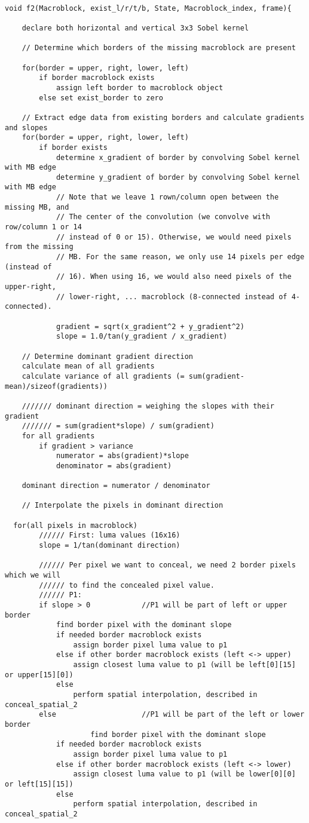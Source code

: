 \vspace{1em}
\begin{lstlisting}[frame=single]

void f2(Macroblock, exist_l/r/t/b, State, Macroblock_index, frame){
	
	declare both horizontal and vertical 3x3 Sobel kernel

	// Determine which borders of the missing macroblock are present

	for(border = upper, right, lower, left)
		if border macroblock exists
			assign left border to macroblock object 
		else set exist_border to zero

	// Extract edge data from existing borders and calculate gradients and slopes
	for(border = upper, right, lower, left)
		if border exists
			determine x_gradient of border by convolving Sobel kernel with MB edge
			determine y_gradient of border by convolving Sobel kernel with MB edge
			// Note that we leave 1 rown/column open between the missing MB, and
			// The center of the convolution (we convolve with row/column 1 or 14
			// instead of 0 or 15). Otherwise, we would need pixels from the missing
			// MB. For the same reason, we only use 14 pixels per edge (instead of 
			// 16). When using 16, we would also need pixels of the upper-right, 
			// lower-right, ... macroblock (8-connected instead of 4-connected).
			
			gradient = sqrt(x_gradient^2 + y_gradient^2)
			slope = 1.0/tan(y_gradient / x_gradient)			

	// Determine dominant gradient direction
	calculate mean of all gradients
	calculate variance of all gradients (= sum(gradient-mean)/sizeof(gradients))
	
	/////// dominant direction = weighing the slopes with their gradient
	/////// = sum(gradient*slope) / sum(gradient)
	for all gradients
		if gradient > variance
			numerator = abs(gradient)*slope
			denominator = abs(gradient)

	dominant direction = numerator / denominator

	// Interpolate the pixels in dominant direction 
	
  for(all pixels in macroblock)
		////// First: luma values (16x16)
		slope = 1/tan(dominant direction)
	
		////// Per pixel we want to conceal, we need 2 border pixels which we will
		////// to find the concealed pixel value.
		////// P1:
		if slope > 0			//P1 will be part of left or upper border
			find border pixel with the dominant slope
			if needed border macroblock exists
				assign border pixel luma value to p1
			else if other border macroblock exists (left <-> upper)
				assign closest luma value to p1 (will be left[0][15] or upper[15][0])
			else
				perform spatial interpolation, described in conceal_spatial_2
		else					//P1 will be part of the left or lower border
					find border pixel with the dominant slope
			if needed border macroblock exists
				assign border pixel luma value to p1
			else if other border macroblock exists (left <-> lower)
				assign closest luma value to p1 (will be lower[0][0] or left[15][15])
			else
				perform spatial interpolation, described in conceal_spatial_2
	

\end{lstlisting}

